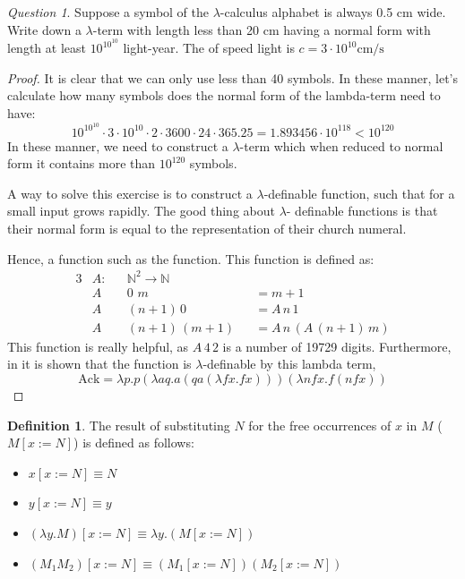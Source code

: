 \documentclass[11pt]{article}
\theoremstyle{definition}
\newtheorem{definition}{Definition}[section]
\theoremstyle{remark}
\theoremstyle{remark}
\newtheorem{question}{Question}
\theoremstyle{definition}
\newcommand{\N}{\mathbb{N}}
\begin{document}
\begin{question}
  Suppose a symbol of the $\lambda$-calculus alphabet is always 0.5 cm wide.
  Write down a $\lambda$-term with length less than 20 cm having a normal form
  with length at least $10^{10^{10}}$ light-year. The of speed light is
  $c = 3 \cdot 10^{10} \text{cm}/\text{s}$
\end{question}
\begin{proof}
  It is clear that we can only use less than 40 symbols. In these manner, let's
  calculate how many symbols does the normal form of the lambda-term need to
  have:
  \begin{equation*}
    10^{10^{10}} \cdot 3 \cdot 10^{10} \cdot 2 \cdot 3600 \cdot 24 \cdot 365.25 =
    1.893456 \cdot 10^{118} < 10^{120}
  \end{equation*}
  In these manner, we need to construct a $\lambda$-term which when reduced to
  normal form it contains more than $10^{120}$ symbols.

  A way to solve this exercise is to construct a $\lambda$-definable function,
  such that for a small input grows rapidly. The good thing about $\lambda$-
  definable functions is that their normal form is equal to the representation
  of their church numeral.

  Hence, a function such as the \textcite{ackermann1928} function. This function
  is defined as:
  \begin{alignat*}{3}
    &A : &&\N^2 \rightarrow \N &&\\
    &A &&0 \,\, m &&= m + 1 \\
    &A &&(n + 1)\, 0 &&= A \, n \, 1 \\
    &A &&(n + 1) \, (m + 1) &&= A \, n \, (A \, (n + 1)\, m)
  \end{alignat*}
  This function is really helpful, as $A \, 4 \, 2$ is a number of 19729 digits.
  Furthermore, in \parencite{goldberg2000} it is shown that the function is
  $\lambda$-definable by this lambda term,
  \begin{equation*}
    \pmb{\mathrm{Ack}} = \lambda p. p (\lambda aq. a(q a (\lambda fx. fx)))(\lambda nfx. f(n f x))
  \end{equation*}
\end{proof}

\begin{definition}
  The result of substituting $N$ for the free occurrences of $x$ in $M$
  ($M[x := N]$) is defined as follows:
  \begin{itemize}
    \item $x[x := N] \equiv N$
    \item $y[x:=N] \equiv y$
    \item $(\lambda y.M)[x := N] \equiv \lambda y. (M[x := N])$
    \item $(M_1M_2)[x := N] \equiv (M_1[x := N]) (M_2[x := N])$
  \end{itemize}
\end{definition}
\end{document}
